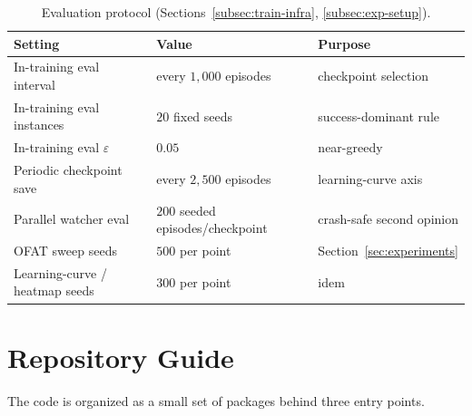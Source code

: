 \begin{table}[h]
\centering
\small
\begin{tabular}{lll}
\toprule
\textbf{Setting} & \textbf{Value} & \textbf{Purpose} \\
\midrule
In-training eval interval  & every $1{,}000$ episodes & checkpoint selection \\
In-training eval instances & $20$ fixed seeds         & success-dominant rule \\
In-training eval $\varepsilon$ & $0.05$               & near-greedy \\
Periodic checkpoint save   & every $2{,}500$ episodes & learning-curve axis \\
Parallel watcher eval      & $200$ seeded episodes/checkpoint & crash-safe second opinion \\
OFAT sweep seeds           & $500$ per point          & Section~\ref{sec:experiments} \\
Learning-curve / heatmap seeds & $300$ per point      & idem \\
\bottomrule
\end{tabular}
\caption{Evaluation protocol (Sections~\ref{subsec:train-infra},
\ref{subsec:exp-setup}).}
\label{tab:app-eval}
\end{table}

\FloatBarrier

\section{Repository Guide}
\label{app:repo}

The code is organized as a small set of packages behind three entry points.

